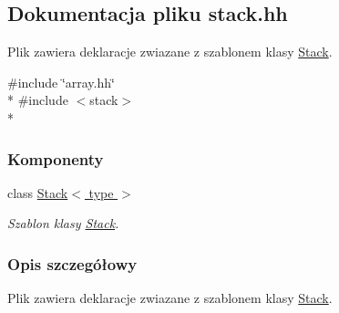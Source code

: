 \hypertarget{stack_8hh}{\subsection{Dokumentacja pliku stack.\-hh}
\label{stack_8hh}
}


Plik zawiera deklaracje zwiazane z szablonem klasy \hyperlink{class_stack}{Stack}.  


{\ttfamily \#include \char`\"{}array.\-hh\char`\"{}}\\*
{\ttfamily \#include $<$stack$>$}\\*
\subsubsection*{Komponenty}
\begin{DoxyCompactItemize}
\item 
class \hyperlink{class_stack}{Stack$<$ type $>$}
\begin{DoxyCompactList}\small\item\em Szablon klasy \hyperlink{class_stack}{Stack}. \end{DoxyCompactList}\end{DoxyCompactItemize}


\subsubsection{Opis szczegółowy}
Plik zawiera deklaracje zwiazane z szablonem klasy \hyperlink{class_stack}{Stack}. 